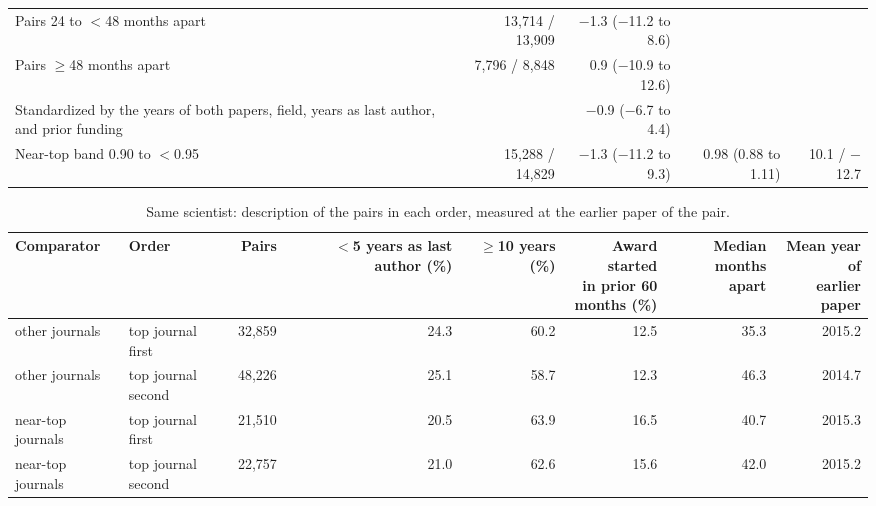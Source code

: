 \begin{table}[H]
\begin{tabularx}{\linewidth}{>{\raggedright\arraybackslash}Xrrrr}
Pairs 24 to $<$48 months apart & 13,714 / 13,909 & $-$1.3 ($-$11.2 to 8.6) &  &  \\
Pairs $\geq$48 months apart & 7,796 / 8,848 & 0.9 ($-$10.9 to 12.6) &  &  \\
Standardized by the years of both papers, field, years as last author, and prior funding &  & $-$0.9 ($-$6.7 to 4.4) &  &  \\
Near-top band 0.90 to $<$0.95 & 15,288 / 14,829 & $-$1.3 ($-$11.2 to 9.3) & 0.98 (0.88 to 1.11) & 10.1 / $-$12.7 \\
\bottomrule
\end{tabularx}
\end{table}

\begin{table}[H]
\centering\small
\caption{Same scientist: description of the pairs in each order, measured at the earlier paper of the pair.}\label{tab:s_pairs_profile}
\footnotesize
\begin{tabularx}{\linewidth}{>{\raggedright\arraybackslash}Xlrrrrrr}
\toprule
Comparator & Order & Pairs & \makecell[rb]{$<$5 years as\\last author\\(\%)} & \makecell[rb]{$\geq$10\\years (\%)} & \makecell[rb]{Award started\\in prior 60\\months (\%)} & \makecell[rb]{Median months\\apart} & \makecell[rb]{Mean year of\\earlier paper} \\
\midrule
other journals & top journal first & 32,859 & 24.3 & 60.2 & 12.5 & 35.3 & 2015.2 \\
other journals & top journal second & 48,226 & 25.1 & 58.7 & 12.3 & 46.3 & 2014.7 \\
near-top journals & top journal first & 21,510 & 20.5 & 63.9 & 16.5 & 40.7 & 2015.3 \\
near-top journals & top journal second & 22,757 & 21.0 & 62.6 & 15.6 & 42.0 & 2015.2 \\
\bottomrule
\end{tabularx}
\end{table}

